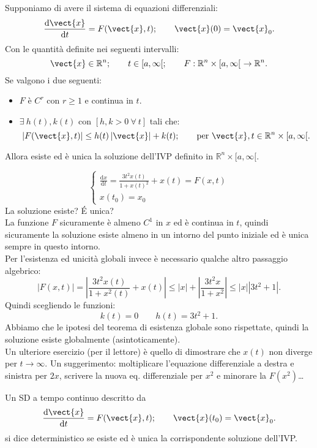 \noindent
\begin{thm}
    Supponiamo di avere il sistema di equazioni differenziali:
    \[
	\frac{\text{d} \vect{x}}{\text{d} t} = F(\vect{x},t); \qquad \vect{x}(0) = \vect{x}_0
    .\] 
    Con le quantità definite nei seguenti intervalli:
    \[
        \vect{x}\in \mathbb{R}^n; \qquad t \in [a,\infty[; \qquad F: \mathbb{R}^n\times [a,\infty[ \ \to \mathbb{R}^n
    .\] 
    Se valgono i due seguenti:
    \begin{itemize}
        \item $F$ è $C^r$ con $r\ge 1$ e continua in $t$.
	\item $\exists \ h(t), k(t)$ con $\left[h, k > 0 \ \forall \ t\right]$ tali che:
	    \[
		\left|F(\vect{x}, t)\right|\le h(t)\left|\vect{x}\right|+k(t); \qquad \text{per } \vect{x}, t \in \mathbb{R}^n\times [a, \infty[
	    .\] 
    \end{itemize}
    Allora esiste ed è unica la soluzione dell'IVP definito in $\mathbb{R}^n\times [a,\infty[$.
\end{thm}
\noindent
\begin{exmp}
   \[
       \begin{cases}
	   \frac{\text{d} x}{\text{d} t} = \frac{3t^2x(t)}{1+x(t)^2}+x(t) = F(x,t)\\
	   x(t_0)=x_0
       \end{cases}
   \]  
   La soluzione esiste? \'E unica? \\
   La funzione $F$  sicuramente è almeno $C^1$  in $x$  ed è continua in $t$, quindi sicuramente la soluzione esiste almeno in un intorno del punto iniziale ed è unica sempre in questo intorno.\\
   Per l'esistenza ed unicità globali invece è necessario qualche altro passaggio algebrico:
   \[
       \left|F(x,t)\right| = \left|\frac{3t^2x(t)}{1+x^2(t)} + x(t)\right|\le \left|x\right|+\left|\frac{3t^2x}{1+x^2}\right| \le
			    \left|x\right|\left|3t^2+1\right|
   .\] 
   Quindi scegliendo le funzioni:
   \[
       k(t)=0 \qquad h(t)=3t^2+1
   .\] 
   Abbiamo che le ipotesi del teorema di esistenza globale sono rispettate, quindi la soluzione esiste globalmente (asintoticamente).\\
   Un ulteriore esercizio (per il lettore) è quello di dimostrare che $x(t)$ non diverge per $t\to \infty$. Un suggerimento: moltiplicare l'equazione differenziale a destra e sinistra per $2x$, scrivere la nuova eq. differenziale per $x^2$ e minorare la $F(x^2)$\ldots 
\end{exmp}
\noindent
\begin{defn}
    Un SD a tempo continuo descritto da
    \[
	\frac{\text{d} \vect{x}}{\text{d} t} = F(\vect{x},t); \qquad \vect{x} (t_0)=\vect{x}_0
    .\] si dice deterministico se esiste ed è unica la corrispondente soluzione dell'IVP.
\end{defn}
\noindent

